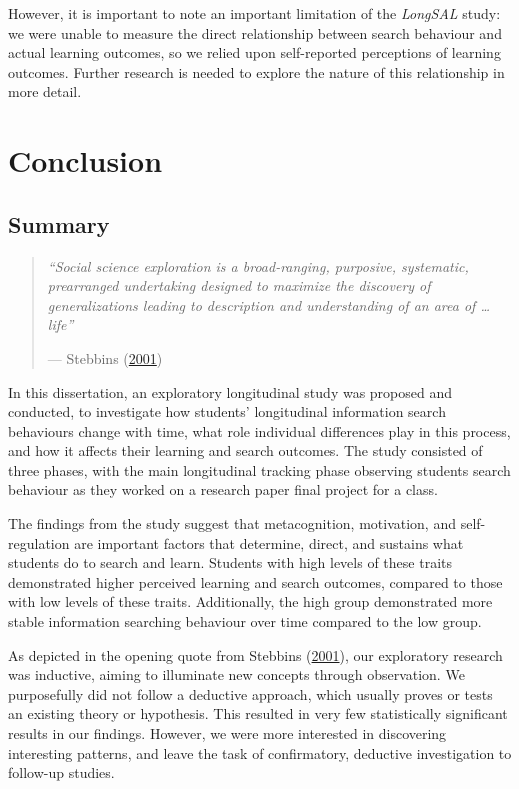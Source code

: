 \documentclass[letterpaper, nobind]{templates/ociamthesis}
\begin{document}
However, it is important to note an important limitation of the \emph{LongSAL} study: we were unable to measure the direct relationship between search behaviour and actual learning outcomes, so we relied upon self-reported perceptions of learning outcomes.
Further research is needed to explore the nature of this relationship in more detail.

\hypertarget{conclusion}{%
\chapter{Conclusion}\label{conclusion}}

\hypertarget{summary-1}{%
\section{Summary}\label{summary-1}}

\begin{quote}
\emph{``Social science exploration is a broad-ranging, purposive, systematic, prearranged undertaking designed to maximize the discovery of generalizations leading to description and understanding of an area of \ldots{} life''}

\hfill --- Stebbins (\protect\hyperlink{ref-stebbins2001exploratory}{2001})
\end{quote}

In this dissertation, an exploratory longitudinal study was proposed and conducted, to investigate how students' longitudinal information search behaviours change with time, what role individual differences play in this process, and how it affects their learning and search outcomes.
The study consisted of three phases, with the main longitudinal tracking phase observing students search behaviour as they worked on a research paper final project for a class.

The findings from the study suggest that metacognition, motivation, and self-regulation are important factors that determine, direct, and sustains what students do to search and learn.
Students with high levels of these traits demonstrated higher perceived learning and search outcomes, compared to those with low levels of these traits.
Additionally, the high group demonstrated more stable information searching behaviour over time compared to the low group.

As depicted in the opening quote from Stebbins (\protect\hyperlink{ref-stebbins2001exploratory}{2001}), our exploratory research was inductive, aiming to illuminate new concepts through observation.
We purposefully did not follow a deductive approach, which usually proves or tests an existing theory or hypothesis.
This resulted in very few statistically significant results in our findings.
However, we were more interested in discovering interesting patterns, and leave the task of confirmatory, deductive investigation to follow-up studies.
\end{document}

